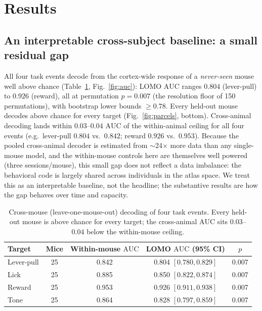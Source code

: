 \documentclass{article}
\newcommand{\auc}{\mathrm{AUC}}
\begin{document}
\section{Results}

\subsection{An interpretable cross-subject baseline: a small residual gap}
\label{sec:main}
All four task events decode from the cortex-wide response of a \emph{never-seen} mouse well above
chance (Table~\ref{tab:main}, Fig.~\ref{fig:auc}): LOMO $\auc$ ranges $0.804$ (lever-pull) to
$0.926$ (reward), all at permutation $p=0.007$ (the resolution floor of 150 permutations), with
bootstrap lower bounds $\geq 0.78$. Every held-out mouse decodes above chance for every target
(Fig.~\ref{fig:parcels}, bottom). Cross-animal decoding lands within $0.03$--$0.04$ $\auc$ of the
within-animal ceiling for all four events (e.g.\ lever-pull $0.804$ vs.\ $0.842$; reward $0.926$
vs.\ $0.953$). Because the pooled cross-animal decoder is estimated from $\sim$24$\times$ more
data than any single-mouse model, and the within-mouse controls here are themselves well powered
(three sessions/mouse), this small gap does not reflect a data imbalance: the behavioral code is
largely shared across individuals in the atlas space. We treat this as an interpretable baseline,
not the headline; the substantive results are how the gap behaves over time and capacity.

\begin{table}[t]\centering
\caption{Cross-mouse (leave-one-mouse-out) decoding of four task events. Every held-out mouse is
above chance for every target; the cross-animal $\auc$ sits $0.03$--$0.04$ below the within-mouse
ceiling.}
\label{tab:main}
\begin{tabular}{lcccc}
\toprule
Target & Mice & Within-mouse $\auc$ & LOMO $\auc$ (95\% CI) & $p$ \\
\midrule
Lever-pull & 25 & 0.842 & 0.804 $[0.780,0.829]$ & 0.007 \\
Lick       & 25 & 0.885 & 0.850 $[0.822,0.874]$ & 0.007 \\
Reward     & 25 & 0.953 & 0.926 $[0.911,0.938]$ & 0.007 \\
Tone       & 25 & 0.864 & 0.828 $[0.797,0.859]$ & 0.007 \\
\bottomrule
\end{tabular}
\end{table}
\end{document}

